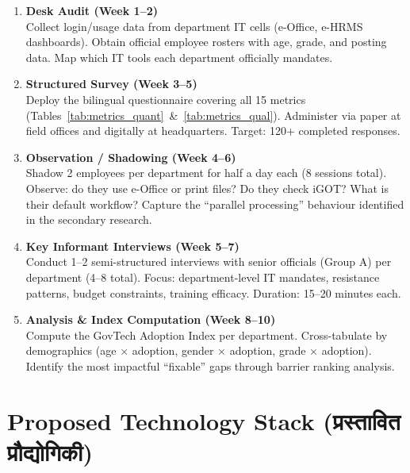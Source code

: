 \documentclass[12pt,a4paper]{article}
\newcommand{\hindi}[1]{{\hindifont #1}}
\begin{document}
\begin{enumerate}[label=\textbf{Step \Alph*:}, leftmargin=2.5cm]

  \item \textbf{Desk Audit (Week 1--2)} \\
  Collect login/usage data from department IT cells (e-Office, e-HRMS dashboards). Obtain official employee rosters with age, grade, and posting data. Map which IT tools each department officially mandates.

  \item \textbf{Structured Survey (Week 3--5)} \\
  Deploy the bilingual questionnaire covering all 15 metrics (Tables~\ref{tab:metrics_quant}~\&~\ref{tab:metrics_qual}). Administer via paper at field offices and digitally at headquarters. Target: 120+ completed responses.

  \item \textbf{Observation / Shadowing (Week 4--6)} \\
  Shadow 2 employees per department for half a day each (8 sessions total). Observe: do they use e-Office or print files? Do they check iGOT? What is their default workflow? Capture the ``parallel processing'' behaviour identified in the secondary research.

  \item \textbf{Key Informant Interviews (Week 5--7)} \\
  Conduct 1--2 semi-structured interviews with senior officials (Group A) per department (4--8 total). Focus: department-level IT mandates, resistance patterns, budget constraints, training efficacy. Duration: 15--20 minutes each.

  \item \textbf{Analysis \& Index Computation (Week 8--10)} \\
  Compute the GovTech Adoption Index per department. Cross-tabulate by demographics (age $\times$ adoption, gender $\times$ adoption, grade $\times$ adoption). Identify the most impactful ``fixable'' gaps through barrier ranking analysis.

\end{enumerate}

\section{Proposed Technology Stack (\hindi{प्रस्तावित प्रौद्योगिकी})}
\end{document}
